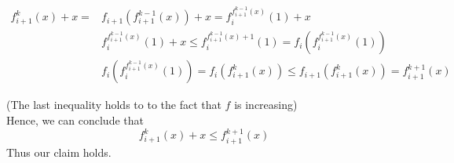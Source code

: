 \documentclass[11pt,a4paper]{article}
\begin{document}
\begin{equation*}
\begin{split}
f_{i+1}^k(x) + x = & f_{i+1}(f_{i+1}^{k-1}(x)) + x = f_i^{f_{i+1}^{k-1}(x)}(1) + x \\
&  f_i^{f_{i+1}^{k-1}(x)}(1) + x \leq  f_i^{f_{i+1}^{k-1}(x)+1}(1) = f_i(f_i^{f_{i+1}^{k-1}(x)}(1)) \\
& f_i(f_i^{f_{i+1}^{k-1}(x)}(1)) = f_i(f_{i+1}^k(x)) \leq  f_{i+1}(f_{i+1}^k(x)) = f_{i+1}^{k+1}(x)
\end{split}
\end{equation*}


(The last inequality holds to to the fact that $f$ is increasing) \\
Hence, we can conclude that 
\begin{equation*}
f_{i+1}^k(x) + x \leq f_{i+1}^{k+1}(x)
\end{equation*}
Thus our claim holds.







\end{document}
